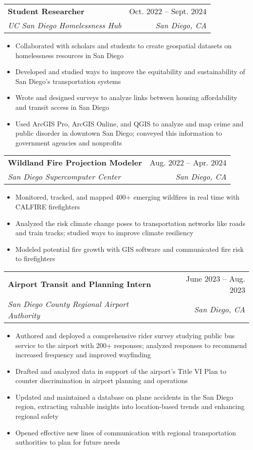 \documentclass[letterpaper,11pt]{article}
\makeatletter
\newcommand{\resumeItem}[1]{
  \item\small{
    {#1 \vspace{-2pt}}
  }
}
\newcommand{\resumeSubheading}[4]{
  \vspace{-2pt}\item
    \begin{tabular*}{0.97\textwidth}[t]{l@{\extracolsep{\fill}}r}
      \textbf{#1} & #2 \\
      \textit{\small#3} & \textit{\small #4} \\
    \end{tabular*}\vspace{-7pt}
}
\newcommand{\resumeSubSubheading}[2]{
    \item
    \begin{tabular*}{0.97\textwidth}{l@{\extracolsep{\fill}}r}
      \textit{\small#1} & \textit{\small #2} \\
    \end{tabular*}\vspace{-7pt}
}
\newcommand{\resumeSubHeadingListEnd}{\end{itemize}}
\newcommand{\resumeItemListStart}{\begin{itemize}}
\newcommand{\resumeItemListEnd}{\end{itemize}\vspace{-5pt}}
\makeatother
\begin{document}
    \resumeSubheading
      {Student Researcher}{Oct. 2022 -- Sept. 2024}
      {UC San Diego Homelessness Hub}{San Diego, CA}
      \resumeItemListStart
        \resumeItem{Collaborated with scholars and students to create geospatial datasets on homelessness resources in San Diego}
        \resumeItem{Developed and studied ways to improve the equitability and sustainability of San Diego’s transportation systems}
        \resumeItem{Wrote and designed surveys to analyze links between housing affordability and transit access in San Diego}
        \resumeItem{Used ArcGIS Pro, ArcGIS Online, and QGIS to analyze and map crime and public disorder in downtown San Diego; conveyed          this information to government agencies and nonprofits}
      \resumeItemListEnd
      

    \resumeSubheading
      {Wildland Fire Projection Modeler}{Aug. 2022 -- Apr. 2024}
      {San Diego Supercomputer Center}{San Diego, CA}
      \resumeItemListStart
        \resumeItem{Monitored, tracked, and mapped 400+ emerging wildfires in real time with CALFIRE firefighters}
        \resumeItem{Analyzed the risk climate change poses to transportation networks like roads and train tracks; studied ways to                   improve climate resiliency}
        \resumeItem{Modeled potential fire growth with GIS software and communicated fire risk to firefighters}
    \resumeItemListEnd

    \resumeSubheading
      {Airport Transit and Planning Intern}{June 2023 -- Aug. 2023}
      {San Diego County Regional Airport Authority}{San Diego, CA}
      \resumeItemListStart
        \resumeItem{Authored and deployed a comprehensive rider survey studying public bus service to the airport with 200+ responses; analyzed responses to recommend increased frequency and improved wayfinding}
        \resumeItem{Drafted and analyzed data in support of the airport’s Title VI Plan to counter discrimination in airport planning and operations}
        \resumeItem{Updated and maintained a database on plane accidents in the San Diego region, extracting valuable insights into location-based trends and enhancing regional safety}
        \resumeItem{Opened effective new lines of communication with regional transportation authorities to plan for future needs}
      \resumeItemListEnd
\end{document}
